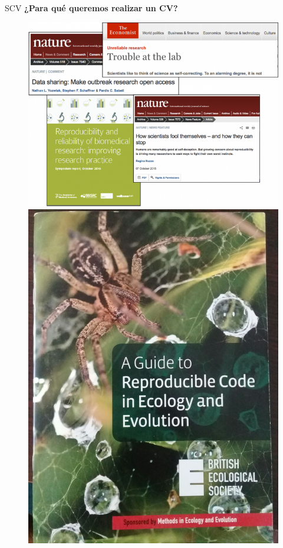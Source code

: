 \documentclass{beamer}
\begin{document}
\begin{frame}{SCV}
\textbf{¿Para qué queremos realizar un CV?}
\begin{figure}
    \centering
    \includegraphics[scale=0.25]{reproducibility.png}
    \includegraphics[scale=0.1]{reproducibilityESA.jpeg}
\end{figure}
\end{frame}
\end{document}
